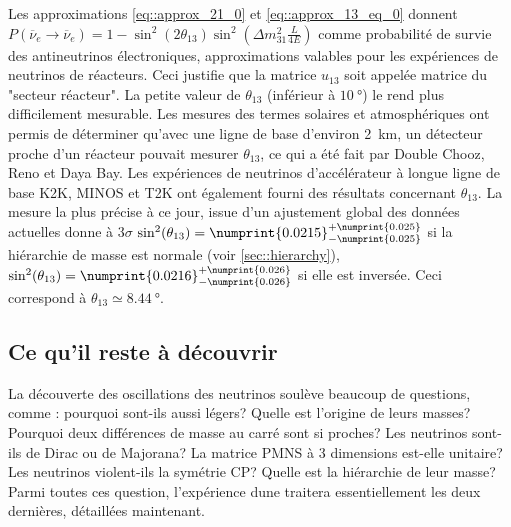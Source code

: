 		    Les approximations \eqref{eq::approx_21_0} et \eqref{eq::approx_13_eq_0} donnent $P(\overline{\nu}_e\to\overline{\nu}_e) = 1-\sin^2(2\theta_{13})\sin^2\left(\Delta m^2_{31}\frac{L}{4E}\right)$ comme probabilité de survie des antineutrinos électroniques, approximations valables pour les expériences de neutrinos de réacteurs. Ceci justifie que la matrice $u_{13}$ soit appelée matrice du "secteur réacteur". La petite valeur de $\theta_{13}$ (inférieur à $\SI{10}{\degree}$) le rend plus difficilement mesurable. Les mesures des termes solaires et atmosphériques ont permis de déterminer qu'avec une ligne de base d'environ \SI{2}{\kilo\meter}, un détecteur proche d'un réacteur pouvait mesurer $\theta_{13}$, ce qui a été fait par Double Chooz\cite{Crespo-Anadon2014}, Reno\cite{Collaboration2010} et Daya Bay\cite{An2014}. Les expériences de neutrinos d'accélérateur à longue ligne de base K2K\cite{Collaboration2006a}, MINOS\cite{Collaboration2014} et T2K\cite{Abe2018} ont également fourni des résultats concernant $\theta_{13}$. La mesure la plus précise à ce jour, issue d'un ajustement global des données actuelles donne à $3\sigma$ $\sin^2(\theta_{13})=\numprint{0.0215}^{+\numprint{0.025}}_{-\numprint{0.025}}$\cite{pdg2018} si la hiérarchie de masse est normale (voir \autoref{sec::hierarchy}), $\sin^2(\theta_{13})=\numprint{0.0216}^{+\numprint{0.026}}_{-\numprint{0.026}}$ si elle est inversée. Ceci correspond à $\theta_{13}\simeq\SI{8.44}{\degree}$.
		    
		    \subsection{Ce qu'il reste à découvrir}
		    
			    La découverte des oscillations des neutrinos soulève beaucoup de questions, comme : pourquoi sont-ils aussi légers? Quelle est l'origine de leurs masses? Pourquoi deux différences de masse au carré sont si proches? Les neutrinos sont-ils de Dirac ou de Majorana? La matrice PMNS à 3 dimensions est-elle unitaire? Les neutrinos violent-ils la symétrie CP? Quelle est la hiérarchie de leur masse? Parmi toutes ces question, l'expérience \gls{dune} traitera essentiellement les deux dernières, détaillées maintenant.
		    
